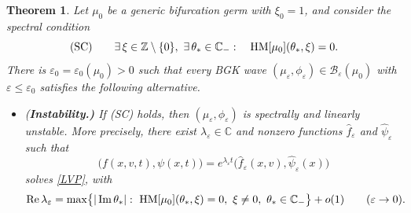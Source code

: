 \documentclass[10pt,reqno]{amsart}
\newtheorem{theorem}{Theorem}
\theoremstyle{definition}
\begin{document}
\begin{theorem}\label{thm:BGK}
Let $\mu_0$ be a generic bifurcation germ with $\xi_0=1$, and consider the spectral condition
\[
\textup{(SC)}\qquad \exists\,\xi\in\mathbb Z\setminus\{0\},\ \exists\,\theta_*\in\mathbb C_-:\quad \mathrm{HM}[\mu_0](\theta_*,\xi)=0 .
\]
There is $\varepsilon_0=\varepsilon_0(\mu_0)>0$ such that every BGK wave $(\mu_\varepsilon,\phi_\varepsilon)\in\mathcal B_\varepsilon(\mu_0)$ with $\varepsilon\leq\varepsilon_0$ satisfies the following alternative.
\begin{itemize}
\item \emph{(\bf{Instability}.)} If \textup{(SC)} holds, then $(\mu_\varepsilon,\phi_\varepsilon)$ is spectrally and linearly unstable. More precisely, there exist $\lambda_\varepsilon\in\mathbb C$ and nonzero functions $\widehat f_\varepsilon$ and $\widehat\psi_\varepsilon$ such that
\[
\bigl(f(x,v,t),\psi(x,t)\bigr)=e^{\lambda_\varepsilon t}\bigl(\widehat f_\varepsilon(x,v),\widehat\psi_\varepsilon(x)\bigr)
\]
solves \eqref{LVP}, with
\[
\operatorname{Re}\lambda_\varepsilon=\max\bigl\{|\operatorname{Im}\theta_*|:\ \HM[\mu_0](\theta_*,\xi)=0,\ \xi\neq0,\ \theta_*\in\mathbb C_-\bigr\}+o(1)\qquad(\varepsilon\to0).
\]


\end{itemize}
\end{theorem}
\end{document}
